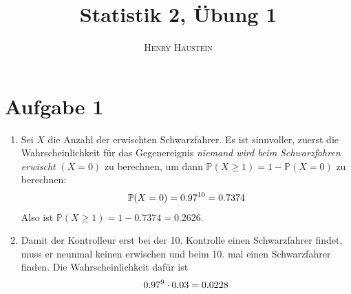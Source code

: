 \documentclass{article}
\title{\textbf{Statistik 2, Übung 1}}
\author{\textsc{Henry Haustein}}
\date{}
\begin{document}
	\maketitle
	
	\section*{Aufgabe 1}
	\begin{enumerate}[label=(\alph*)]
		\item Sei $X$ die Anzahl der erwischten Schwarzfahrer. Es ist sinnvoller, zuerst die Wahrscheinlichkeit für das Gegenereignis \textit{niemand wird beim Schwarzfahren erwischt} $(X=0)$ zu berechnen, um dann $\mathbb{P}(X\ge 1) = 1 - \mathbb{P}(X=0)$ zu berechnen:
		\begin{align}
			\mathbb{P}(X=0) = 0.97^{10} = 0.7374 \notag
		\end{align}
		Also ist $\mathbb{P}(X\ge 1) = 1 - 0.7374 = 0.2626$.
		\item Damit der Kontrolleur erst bei der 10. Kontrolle einen Schwarzfahrer findet, muss er neunmal keinen erwischen und beim 10. mal einen Schwarzfahrer finden. Die Wahrscheinlichkeit dafür ist
		\begin{align}
			0.97^9 \cdot 0.03 = 0.0228 \notag
		\end{align}
	\end{enumerate}
\end{document}
